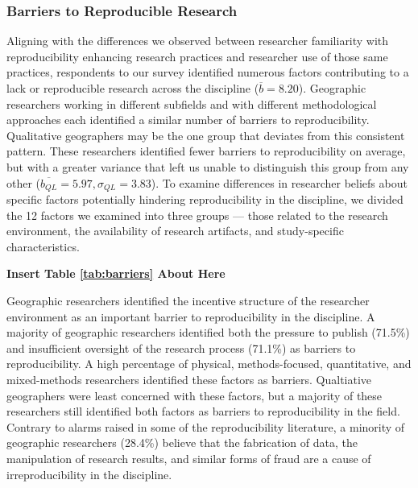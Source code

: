 \documentclass[]{interact}
\theoremstyle{plain}%
\theoremstyle{definition}
\theoremstyle{remark}
\begin{document}
\subsubsection*{Barriers to Reproducible Research}
Aligning with the differences we observed between researcher familiarity with reproducibility enhancing research practices and researcher use of those same practices, respondents to our survey identified numerous factors contributing to a lack or reproducible research across the discipline ($\overline{b}=8.20$). 
Geographic researchers working in different subfields and with different methodological approaches each identified a similar number of barriers to reproducibility.
Qualitative geographers may be the one group that deviates from this consistent pattern. 
These researchers identified fewer barriers to reproducibility on average, but with a greater variance that left us unable to distinguish this group from any other ($\overline{b_{QL}}=5.97, \sigma_{QL}=3.83$).
To examine differences in researcher beliefs about specific factors potentially hindering reproducibility in the discipline, we divided the 12 factors we examined into three groups --- those related to the research environment, the availability of research artifacts, and study-specific characteristics. 

\begin{center}
\textbf{Insert Table \ref{tab:barriers} About Here}
\end{center}

Geographic researchers identified the incentive structure of the researcher environment as an important barrier to reproducibility in the discipline.
A majority of geographic researchers identified both the pressure to publish (71.5\%) and insufficient oversight of the research process (71.1\%) as barriers to reproducibility.
A high percentage of physical, methods-focused, quantitative, and mixed-methods researchers identified these factors as barriers. 
Qualtiative geographers were least concerned with these factors, but a majority of these researchers still identified both factors as barriers to reproducibility in the field.
Contrary to alarms raised in some of the reproducibility literature, a minority of geographic researchers (28.4\%) believe that the fabrication of data, the manipulation of research results, and similar forms of fraud are a cause of irreproducibility in the discipline.
\end{document}

